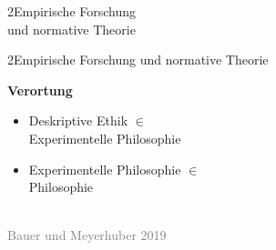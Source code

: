 \documentclass[xcolor=table,9pt,aspectratio=169]{beamer}
\begin{document}
\begin{frame}
\begin{overlayarea}{\textwidth}{0.81\paperheight}{
   \vspace*{11mm}
   \textcolor{uolblue}
   {2\hspace*{1em}Empirische Forschung\\\hspace*{1.5em}und normative Theorie}
}
\end{overlayarea}
\end{frame}


\begin{frame}{\vspace*{10mm}2\hspace*{1em}Empirische Forschung und normative Theorie}
\begin{multicols}{2}
   \textbf{Verortung}\\
   \medskip
   \begin{itemize}
      \item Deskriptive Ethik $\in$\\Experimentelle Philosophie
      \item Experimentelle Philosophie $\in$\\Philosophie
   \end{itemize}
   \vfill
   \begin{center}
      \\
      \footnotesize{\textcolor{gray}{Bauer und Meyerhuber 2019}}
   \end{center}
\end{multicols}
\end{frame}
\end{document}
